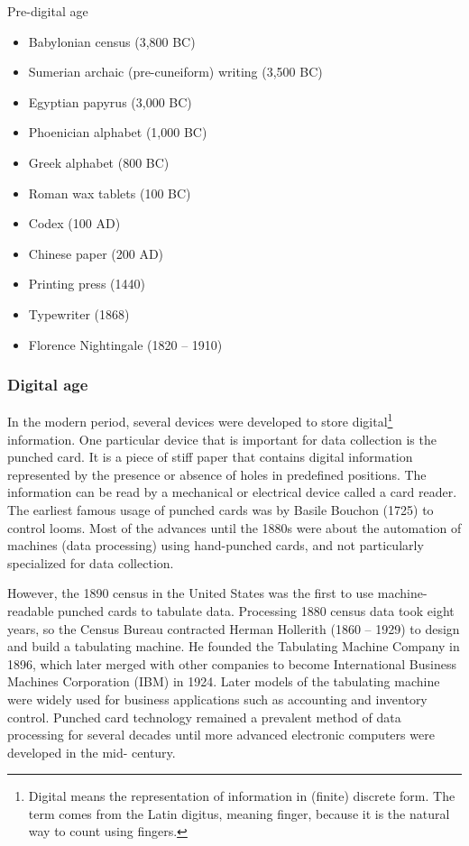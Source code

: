 \begin{mainbox}{Pre-digital age}
  \begin{itemize}
    \item Babylonian census (3,800 BC)
    \item Sumerian archaic (pre-cuneiform) writing (3,500 BC)
    \item Egyptian papyrus (3,000 BC)
    \item Phoenician alphabet (1,000 BC)
    \item Greek alphabet (800 BC)
    \item Roman wax tablets (100 BC)
    \item Codex (100 AD)
    \item Chinese paper (200 AD)
    \item Printing press (1440)
    \item Typewriter (1868)
    \item Florence Nightingale (1820 -- 1910)
  \end{itemize}
\end{mainbox}

\subsubsection{Digital age}

In the modern period, several devices were developed to store digital\footnote{Digital
means the representation of information in (finite) discrete form.  The term comes from the Latin
digitus, meaning finger, because it is the natural way to count using fingers.}
information.  One particular device that is important for data collection is the punched
card.  It is a piece of stiff paper that contains digital information represented by the
presence or absence of holes in predefined positions.  The information can be read by a
mechanical or electrical device called a card reader.  The earliest famous usage of
punched cards was by Basile Bouchon (1725) to control looms.  Most of the advances until
the 1880s were about the automation of machines (data processing) using hand-punched cards, and not
particularly specialized for data collection.

However, the 1890 census in the United States was the first to use machine-readable
punched cards to tabulate data. Processing 1880 census data took eight years, so the
Census Bureau contracted Herman Hollerith (1860 -- 1929) to design and build a tabulating
machine.  He founded the Tabulating Machine Company in 1896, which later merged with other
companies to become International Business Machines Corporation (IBM) in 1924. Later
models of the tabulating machine were widely used for business applications such as
accounting and inventory control. Punched card technology remained a prevalent method of
data processing for several decades until more advanced electronic computers were
developed in the mid- century.

